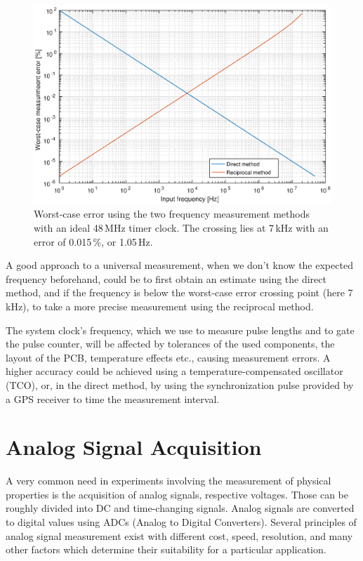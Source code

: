 \begin{figure}[h]
	\centering
	\includegraphics[width=\textwidth] {img/freqmethods.eps}
	\caption[Frequency measurement methods comparison]{\label{fig:freqmethods-graph}Worst-case error using the two frequency measurement methods with an ideal 48\,MHz timer clock. The crossing lies at 7\,kHz with an error of 0.015\,\%, or 1.05\,Hz.}
\end{figure}

A good approach to a universal measurement, when we don't know the expected frequency beforehand, could be to first obtain an estimate using the direct method, and if the frequency is below the worst-case error crossing point (here 7\,kHz), to take a more precise measurement using the reciprocal method.

The system clock's frequency, which we use to measure pulse lengths and to gate the pulse counter, will be affected by tolerances of the used components, the layout of the PCB, temperature effects etc., causing measurement errors. A higher accuracy could be achieved using a temperature-compensated oscillator (TCO), or, in the direct method, by using the synchronization pulse provided by a GPS receiver to time the measurement interval.

\section{Analog Signal Acquisition} \label{sec:theory-adc}

A very common need in experiments involving the measurement of physical properties is the acquisition of analog signals, respective voltages. Those can be roughly divided into DC and time-changing signals. Analog signals are converted to digital values using ADCs (Analog to Digital Converters). Several principles of analog signal measurement exist with different cost, speed, resolution, and many other factors which determine their suitability for a particular application. 

